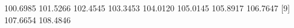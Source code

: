 \begin{Schunk}
% --begin: "frbe"
\begin{Soutput}
 [1] 100.6985 101.5266 102.4545 103.3453 104.0120 105.0145 105.8917 106.7647
 [9] 107.6654 108.4846
\end{Soutput}
%
% --end: "frbe"
\end{Schunk}
